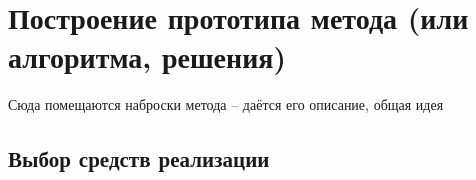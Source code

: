 \chapter{Построение прототипа метода (или алгоритма, решения)}

Сюда помещаются наброски метода – даётся его описание, общая идея


\section{Выбор средств реализации}


